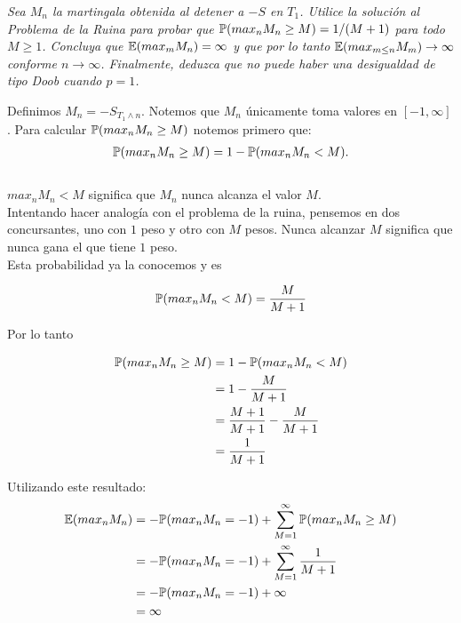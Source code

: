 \emph{
	Sea $M_n$ la martingala obtenida al detener a $-S$ en $T_1$. Utilice la solución al
	Problema de la Ruina para probar que $\mathbb{P}(max_n M_n \geq M) = 1/(M+1)$ para todo $M \geq 1$. Concluya que
	$\mathbb{E}(max_m M_n) = \infty$ y que por lo tanto $\mathbb{E}(max_{m\leq n} M_m) \rightarrow \infty$ conforme 
	$n \rightarrow \infty$. Finalmente, deduzca que no puede haber una desigualdad de tipo Doob cuando $p=1$.\\
}	

	Definimos $M_n = -S_{T_1 \wedge n}$. Notemos que $M_n$ únicamente toma valores en $[-1, \infty]$.
	Para calcular $\mathbb{P}(max_n M_n \geq M)$ notemos primero que:
	\begin{align}
		\mathbb{P}(max_n M_n \geq M) = 1 - \mathbb{P}(max_n M_n < M).
	\end{align}\\
	
	$max_n M_n < M$ significa que $M_n$ nunca alcanza el valor $M$.\\
	 
	Intentando hacer analogía con el problema de la ruina, pensemos en dos concursantes,
	uno con $1$ peso y otro con $M$ pesos. Nunca alcanzar $M$ significa que nunca gana el que tiene $1$ peso.\\
	
	Esta probabilidad ya la conocemos y es 
	
	\begin{align}
		\mathbb{P}(max_n M_n < M) = \frac{M}{M + 1}
	\end{align}
		
	Por lo tanto
	
	\begin{align}
		\mathbb{P}(max_n M_n \geq M) 	&= 1 - \mathbb{P}(max_n M_n < M) \\
								&= 1 - \frac{M}{M + 1}\\
								&= \frac{M+1}{M+1} - \frac{M}{M + 1}\\
								&= \frac{1}{M+1}
	\end{align}
	
	Utilizando este resultado:
	\begin{align} \label{problema1_3:esperanza_del_maximo_de_M_n}
		\mathbb{E}(max_n M_n) 	&= - \mathbb{P}(max_n M_n = -1) + \sum_{M=1}^{\infty} \mathbb{P}(max_n M_n \geq M) \\
						&= - \mathbb{P}(max_n M_n = -1) + \sum_{M=1}^{\infty} \frac{1}{M+1} \\ 
						&= - \mathbb{P}(max_n M_n = -1) + \infty \\
						&= \infty
	\end{align}						
	
